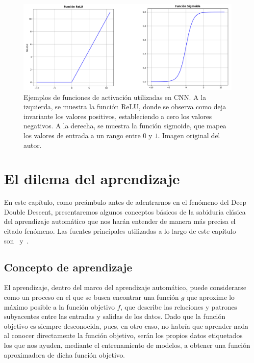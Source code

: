\begin{figure}[h]
    \centering
    \includegraphics[width=0.8\linewidth]{img/funcionesactivacion.png}
    \caption[Ejemplos de funciones de activación utilizadas en CNN.]{Ejemplos de funciones de activación utilizadas en CNN. A la izquierda, se muestra la función ReLU, donde se observa como deja invariante los valores positivos, estableciendo a cero los valores negativos. A la derecha, se muestra la función sigmoide, que mapea los valores de entrada a un rango entre $0$ y $1$. Imagen original del autor.}\label{fig:funcionesactivacion}
\end{figure}

\chapter{El dilema del aprendizaje}\label{ch:dilema-aprendizaje}

En este capítulo, como preámbulo antes de adentrarnos en el fenómeno del Deep Double Descent, presentaremos algunos conceptos básicos de la sabiduría clásica del aprendizaje automático que nos harán entender de manera más precisa el citado fenómeno. Las fuentes principales utilizadas a lo largo de este capítulo son~\cite{Mostafa2012} y~\cite{Bishop2006}.\newline

\section{Concepto de aprendizaje}\label{sec:concepto-de-aprendizaje}
El aprendizaje, dentro del marco del aprendizaje automático, puede considerarse como un proceso en el que se busca encontrar una función $g$ que aproxime lo máximo posible a la función objetivo $f$, que describe las relaciones y patrones subyacentes entre las entradas y salidas de los datos. Dado que la función objetivo es siempre desconocida, pues, en otro caso, no habría que aprender nada al conocer directamente la función objetivo, serán los propios datos etiquetados los que nos ayuden, mediante el entrenamiento de modelos, a obtener una función aproximadora de dicha función objetivo.\newline

